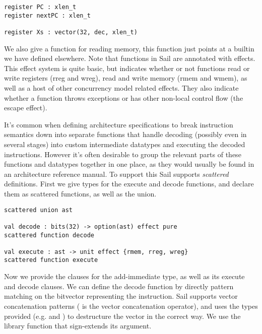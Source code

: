 \begin{lstlisting}
register PC : xlen_t
register nextPC : xlen_t

register Xs : vector(32, dec, xlen_t)
\end{lstlisting}

\sailrX
\sailfnrX
\sailfnrXA

\sailwX
\sailfnwX
\sailX

We also give a function  for reading memory, this function
just points at a builtin we have defined elsewhere. Note that
functions in Sail are annotated with effects. This effect system is
quite basic, but indicates whether or not functions read or write
registers (rreg and wreg), read and write memory (rmem and wmem), as
well as a host of other concurrency model related effects. They also
indicate whether a function throws exceptions or has other non-local
control flow (the escape effect).

\sailMEMr
\sailfnMEMr

It's common when defining architecture specifications to break
instruction semantics down into separate functions that handle
decoding (possibly even in several stages) into custom intermediate
datatypes and executing the decoded instructions. However it's often
desirable to group the relevant parts of these functions and datatypes
together in one place, as they would usually be found in an
architecture reference manual. To support this Sail supports
\emph{scattered} definitions. First we give types for the execute and
decode functions, and declare them as scattered functions, as well as
the  union.

\sailiop

\begin{lstlisting}
scattered union ast

val decode : bits(32) -> option(ast) effect pure
scattered function decode

val execute : ast -> unit effect {rmem, rreg, wreg}
scattered function execute
\end{lstlisting}

Now we provide the clauses for the add-immediate  type, as
well as its execute and decode clauses. We can define the decode
function by directly pattern matching on the bitvector representing
the instruction. Sail supports vector concatenation patterns (
is the vector concatenation operator), and uses the types provided
(e.g.  and ) to destructure the vector in the
correct way. We use the  library function that sign-extends
its argument.

